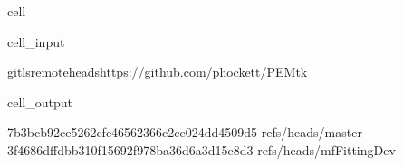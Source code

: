 \documentclass[letterpaper,table,10pt,english]{jupyterBook}
\begin{document}
\begin{sphinxuseclass}{cell}\begin{sphinxVerbatimInput}

\begin{sphinxuseclass}{cell_input}
\begin{sphinxVerbatim}[commandchars=\\\{\}]
gitls\PYGZhy{}remote\PYGZhy{}\PYGZhy{}headshttps://github.com/phockett/PEMtk
\end{sphinxVerbatim}

\end{sphinxuseclass}\end{sphinxVerbatimInput}
\begin{sphinxVerbatimOutput}

\begin{sphinxuseclass}{cell_output}
\begin{sphinxVerbatim}[commandchars=\\\{\}]
7b3bcb92ce5262cfc46562366c2ce024dd4509d5	refs/heads/master
3f4686dffdbb310f15692f978ba36d6a3d15e8d3	refs/heads/mfFittingDev
\end{sphinxVerbatim}

\end{sphinxuseclass}\end{sphinxVerbatimOutput}

\end{sphinxuseclass}
\end{document}
